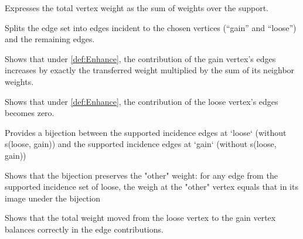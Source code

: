 \begin{lemma}
  \label{lem:sum_over_support}
  \leanok
  Expresses the total vertex weight as the sum of weights over the support.
\end{lemma}

\begin{lemma}
  \label{lem:supported_edge_partition}
  \leanok
  Splits the edge set into edges incident to the chosen vertices (“gain” and “loose”)
  and the remaining edges.
\end{lemma}

\begin{lemma}
  \label{lem:Enhance_gain_sum}
  \leanok
  Shows that under \ref{def:Enhance}, the contribution of the gain vertex’s edges
  increases by exactly the transferred weight multiplied by the sum of its neighbor weights.
\end{lemma}

\begin{lemma}
  \label{lem:Enhance_loose_sum}
  \leanok
  Shows that under \ref{def:Enhance}, the contribution of the loose vertex’s edges
  becomes zero.
\end{lemma}

\begin{definition}
    \label{def:the_bij}
    \leanok
    Provides a bijection between the supported incidence edges at `loose` (without s(loose, gain)) and the supported incidence edges at `gain` (without s(loose, gain))
\end{definition}

\begin{lemma}
  \label{lem:the_bij_same}
  \leanok
   Shows that the bijection preserves the "other" weight: for any edge from the supported incidence set of loose, the weigh at the "other" vertex equals that in its image uneder the bijection
\end{lemma}

\begin{lemma}
  \label{lem:Enhance_sum_loose_gain_equal}
  \leanok
  Shows that the total weight moved from the loose vertex to the gain vertex
  balances correctly in the edge contributions.
\end{lemma}

